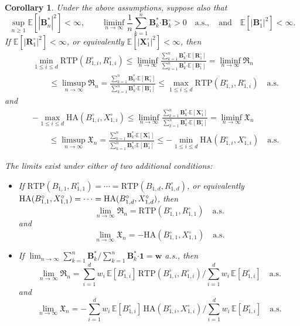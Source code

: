 \documentclass{article}
\newtheorem{corollary}[theorem]{Corollary}
\theoremstyle{definition}
\theoremstyle{remark}
\newcommand{\E}{\mathbb{E}}
\newcommand{\RTP}{\mathrm{RTP}}
\newcommand{\HA}{\mathrm{HA}}
\begin{document}
\begin{corollary}\label{cor:multiple_bets-compound}
Under the above assumptions, suppose also that 
\[
\sup_{n \ge 1} \E[|\bm B_n^*|^2] < \infty,\qquad\liminf_{n\to\infty}\frac{1}{n}\sum_{k=1}^n \bm B_k^*\bm\cdot\bm B_k^\circ>0\quad\text{a.s.}, \quad \text{and} \quad \E[|\bm B_1^\circ|^2]<\infty.
\]
If $\E[|\bm R_1^\circ|^2] < \infty$, or equivalently $\E[|\bm X_1^\circ|^2] < \infty$, then 
\begin{align*}
&\min_{1\le i \le d}\RTP(B_{1,i}^\circ,R_{1,i}^\circ)\le\liminf_{n\to\infty}\frac{\sum_{k=1}^n \bm B_k^*\bm\cdot\E[\bm R_1^\circ]}{\sum_{k=1}^n \bm B_k^*\bm\cdot\E[\bm B_1^\circ]}=\liminf_{n\to\infty}\mathfrak{R}_n\\
&\qquad{}\le\limsup_{n\to\infty}\mathfrak{R}_n=\frac{\sum_{k=1}^n \bm B_k^*\bm\cdot\E[\bm R_1^\circ]}{\sum_{k=1}^n \bm B_k^*\bm\cdot\E[\bm B_1^\circ]}\le\max_{1\le i \le d}\RTP(B_{1,i}^\circ,R_{1,i}^\circ)\quad\text{a.s.}
\end{align*}
and
\begin{align*}
&-\max_{1\le i \le d}\HA(B_{1,i}^\circ,X_{1,i}^\circ)\le\liminf_{n\to\infty}\frac{\sum_{k=1}^n \bm B_k^*\bm\cdot\E[\bm X_1^\circ]}{\sum_{k=1}^n \bm B_k^*\bm\cdot\E[\bm B_1^\circ]}=\liminf_{n\to\infty}\mathfrak{X}_n\\
&\qquad{}\le\limsup_{n\to\infty}\mathfrak{X}_n=\frac{\sum_{k=1}^n \bm B_k^*\bm\cdot\E[\bm X_1^\circ]}{\sum_{k=1}^n \bm B_k^*\bm\cdot\E[\bm B_1^\circ]}\le-\min_{1\le i \le d}\HA(B_{1,i}^\circ,X_{1,i}^\circ)\quad\text{a.s.}
\end{align*}

The limits exist under either of two additional conditions: 
\begin{itemize}
    \item If $\RTP(B_{1,1},R_{1,1}^\circ)=\cdots=\RTP(B_{1,d},R_{1,d}^\circ)$, or equivalently $\HA(B_{1,1}^\circ,\break X_{1,1}^\circ)=\cdots=\HA(B_{1,d}^\circ,X_{1,d}^\circ)$, then
\[
\lim_{n\to\infty}\mathfrak{R}_n=\RTP(B_{1,1}^\circ,R_{1,1}^\circ)\quad\text{a.s.} \]
and \[\lim_{n\to\infty}\mathfrak{X}_n=-\HA(B_{1,1}^\circ,X_{1,1}^\circ)\quad\text{a.s.}
\]

\item If $\lim_{n\to\infty}\sum_{k=1}^n \bm B_k^*/\sum_{k=1}^n \bm B_k^*\bm\cdot\bm1=\bm w$ a.s., then
\[
\lim_{n\to\infty}\mathfrak{R}_n=\sum_{i=1}^d w_i\,\E[B_{1,i}^\circ]\,\RTP(B_{1,i}^\circ,R_{1,i}^\circ)\bigg/\sum_{i=1}^d w_i\,\E[B_{1,i}^\circ]\quad\text{a.s.}
\]
and 
\[
\lim_{n\to\infty}\mathfrak{X}_n=-\sum_{i=1}^d w_i\,\E[B_{1,i}^\circ]\,\HA(B_{1,i}^\circ,X_{1,i}^\circ)\bigg/\sum_{i=1}^d w_i\,\E[B_{1,i}^\circ]\quad\text{a.s.}
\]
\end{itemize}

\end{corollary}
\end{document}
